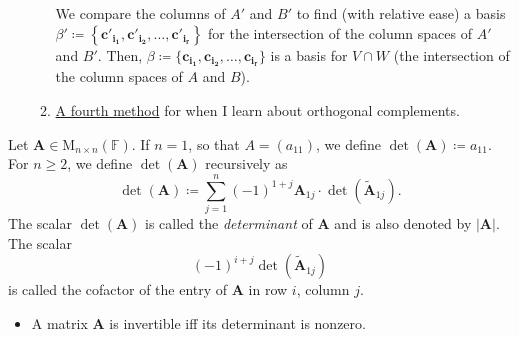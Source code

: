\documentclass[../Notes.tex]{subfiles}
\begin{document}
\begin{stbox}{}
\begin{itemize}
\begin{enumerate}
        We compare the columns of \(A'\) and \(B'\) to find (with relative ease) a basis \(\beta'\coloneq\left\{\mathbf{c'_{i_1}},\mathbf{c'_{i_2}},\dots,\mathbf{c'_{i_r}}\right\}\) for the intersection of the column spaces of \(A'\) and \(B'\). Then, \(\beta\coloneq\{\mathbf{c_{i_1}},\mathbf{c_{i_2}},\dots,\mathbf{c_{i_r}}\}\) is a basis for \(V\cap W\) (the intersection of the column spaces of \(A\) and \(B\)).
        \item \href{https://math.stackexchange.com/a/4837004}{A fourth method} for when I learn about orthogonal complements. 
        \end{enumerate}
    \end{itemize}
\end{stbox}
\begin{definition}{}{}
    Let \(\mathbf{A}\in \mathrm{M}_{n\times n}(\mathbb{F})\). If \(n=1\), so that \(A=(a_{11})\), we define \(\det(\mathbf{A})\coloneq a_{11}\). For \(n\geq 2\), we define \(\det(\mathbf{A})\) recursively as 
    \[\det(\mathbf{A})\coloneq \sum_{j=1}^{n}{(-1)^{1+j}}\mathbf{A}_{1j}\cdot \det(\widetilde{\mathbf{A}}_{1j}).\]
    The scalar \(\det(\mathbf{A})\) is called the \emph{determinant} of \(\mathbf{A}\) and is also denoted by \(\lvert \mathbf{A} \rvert\). The scalar 
    \[(-1)^{i+j}\det(\widetilde{\mathbf{A}}_{1j})\]
    is called the cofactor of the entry of \(\mathbf{A}\) in row \(i\), column \(j\).
\end{definition}
\begin{stbox}{}
    \begin{itemize}
        \item A matrix \(\mathbf{A}\) is invertible iff its determinant is nonzero. 
    \end{itemize}
\end{stbox}
\end{document}
